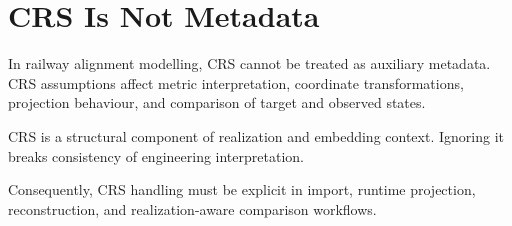 \section*{CRS Is Not Metadata}

In railway alignment modelling, CRS cannot be treated as auxiliary
metadata. CRS assumptions affect metric interpretation, coordinate
transformations, projection behaviour, and comparison of target and
observed states.

\begin{principle}
CRS is a structural component of realization and embedding context.
Ignoring it breaks consistency of engineering interpretation.
\end{principle}

Consequently, CRS handling must be explicit in import, runtime
projection, reconstruction, and realization-aware comparison workflows.
